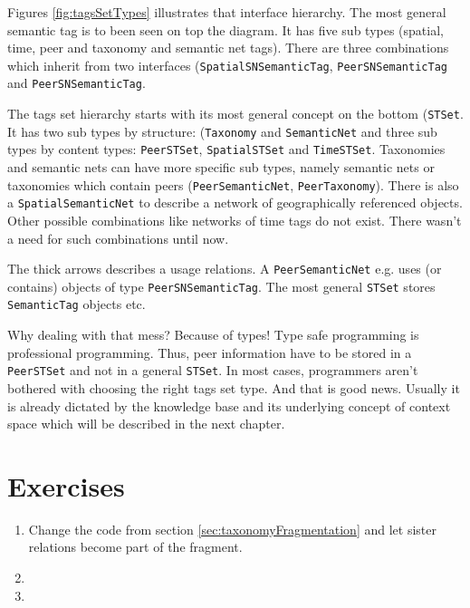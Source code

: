 Figures \ref{fig:tagsSetTypes} illustrates that interface hierarchy. The most general semantic tag is to been seen on top the diagram. It has five sub types (spatial, time, peer and taxonomy and semantic net tags). There are three combinations which inherit from two interfaces 
({\tt SpatialSNSemanticTag}, {\tt PeerSNSemanticTag} and 
{\tt PeerSNSemanticTag}.

The tags set hierarchy starts with its most general concept on the bottom ({\tt STSet}. It has two sub types by structure: ({\tt Taxonomy} and {\tt SemanticNet} and three sub types by content types: {\tt PeerSTSet}, {\tt SpatialSTSet} and {\tt TimeSTSet}. Taxonomies and semantic nets can have more specific sub types, namely semantic nets or taxonomies which contain peers ({\tt PeerSemanticNet}, {\tt PeerTaxonomy}). There is also a {\tt SpatialSemanticNet} to describe a network of geographically referenced objects. Other possible combinations like networks of time tags do not exist. There wasn't a need for such combinations until now.

The thick arrows describes a usage relations. A {\tt PeerSemanticNet} e.g. uses (or contains) objects of type {\tt PeerSNSemanticTag}. The most general {\tt STSet} stores {\tt SemanticTag} objects etc.

Why dealing with that mess? Because of types! Type safe programming is professional programming. Thus, peer information have to be stored in a {\tt PeerSTSet} and not in a general {\tt STSet}. In most cases, programmers aren't bothered with choosing the right tags set type. And that is good news. Usually it is already dictated by the knowledge base and its underlying concept of context space which will be described in the next chapter.

\section{Exercises}
\begin{enumerate}
\item 
Change the code from section \ref{sec:taxonomyFragmentation} and let sister relations become part of the fragment.
\item 
\item 

\end{enumerate}
